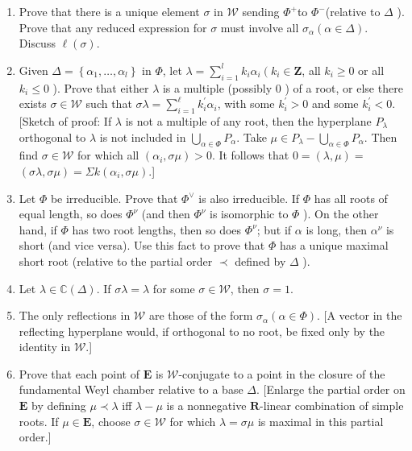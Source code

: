 \documentclass[10pt]{article}
\begin{document}
\begin{enumerate}
  \item Prove that there is a unique element $\sigma$ in $\mathscr{W}$ sending $\Phi^{+}$to $\Phi^{-}$(relative to $\Delta$ ). Prove that any reduced expression for $\sigma$ must involve all $\sigma_{\alpha}(\alpha \in \Delta)$. Discuss $\ell(\sigma)$.
  \item Given $\Delta=\left\{\alpha_{1}, \ldots, \alpha_{l}\right\}$ in $\Phi$, let $\lambda=\sum_{i=1}^{l} k_{i} \alpha_{i}\left(k_{i} \in \mathbf{Z}\right.$, all $k_{i} \geq 0$ or all $k_{i} \leq 0$ ). Prove that either $\lambda$ is a multiple (possibly 0 ) of a root, or else there exists $\sigma \in \mathscr{W}$ such that $\sigma \lambda=\sum_{i=1}^{\ell} k_{i}^{\prime} \alpha_{i}$, with some $k_{i}^{\prime}>0$ and some $k_{i}^{\prime}<0$. [Sketch of proof: If $\lambda$ is not a multiple of any root, then the hyperplane $P_{\lambda}$ orthogonal to $\lambda$ is not included in $\bigcup_{\alpha \in \Phi} P_{\alpha}$. Take $\mu \in P_{\lambda}-\bigcup_{\alpha \in \Phi} P_{\alpha}$. Then find $\sigma \in \mathscr{W}$ for which all $\left(\alpha_{i}, \sigma \mu\right)>0$. It follows that $0=(\lambda, \mu)=$ $(\sigma \lambda, \sigma \mu)=\Sigma k\left(\alpha_{i}, \sigma \mu\right)$.]
  \item Let $\Phi$ be irreducible. Prove that $\Phi^{\vee}$ is also irreducible. If $\Phi$ has all roots of equal length, so does $\Phi^{\nu}$ (and then $\Phi^{\nu}$ is isomorphic to $\Phi$ ). On the other hand, if $\Phi$ has two root lengths, then so does $\Phi^{\nu}$; but if $\alpha$ is long, then $\alpha^{\nu}$ is short (and vice versa). Use this fact to prove that $\Phi$ has a unique maximal short root (relative to the partial order $\prec$ defined by $\Delta$ ).
  \item Let $\lambda \in \mathbb{C}(\Delta)$. If $\sigma \lambda=\lambda$ for some $\sigma \in \mathscr{W}$, then $\sigma=1$.
  \item The only reflections in $\mathscr{W}$ are those of the form $\sigma_{\alpha}(\alpha \in \Phi)$. [A vector in the reflecting hyperplane would, if orthogonal to no root, be fixed only by the identity in $\mathscr{W}$.]
  \item Prove that each point of $\mathbf{E}$ is $\mathscr{W}$-conjugate to a point in the closure of the fundamental Weyl chamber relative to a base $\Delta$. [Enlarge the partial order on $\mathbf{E}$ by defining $\mu \prec \lambda$ iff $\lambda-\mu$ is a nonnegative $\mathbf{R}$-linear combination of simple roots. If $\mu \in \mathbf{E}$, choose $\sigma \in \mathscr{W}$ for which $\lambda=\sigma \mu$ is maximal in this partial order.]
\end{enumerate}
\end{document}
